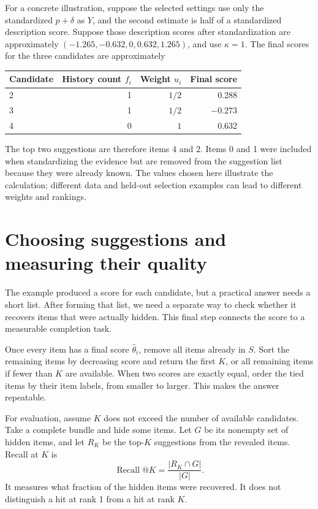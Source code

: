 \documentclass[11pt,a4paper]{article}
\numberwithin{equation}{section}
\begin{document}
For a concrete illustration, suppose the selected settings use only the standardized
$p+\delta$ as $Y$, and the second estimate is half of a standardized description score.
Suppose those description scores after standardization are approximately
$(-1.265,-0.632,0,0.632,1.265)$, and use $\kappa=1$. The final scores for the three
candidates are approximately
\begin{center}\begin{tabular}{@{}lrrr@{}}\toprule
Candidate & History count $f_i$ & Weight $u_i$ & Final score \\\midrule
2 & 1 & $1/2$ & 0.288 \\
3 & 1 & $1/2$ & $-0.273$ \\
4 & 0 & $1$ & 0.632 \\\bottomrule\end{tabular}\end{center}
The top two suggestions are therefore items 4 and 2. Items 0 and 1 were included when
standardizing the evidence but are removed from the suggestion list because they were
already known. The values chosen here illustrate the calculation; different data and
held-out selection examples can lead to different weights and rankings.

\section{Choosing suggestions and measuring their quality}
The example produced a score for each candidate, but a practical answer needs a short list.
After forming that list, we need a separate way to check whether it recovers items that
were actually hidden. This final step connects the score to a measurable completion task.

Once every item has a final score $\widehat\theta_i$, remove all items already in $S$.
Sort the remaining items by decreasing score and return the first $K$, or all remaining items if fewer than $K$ are available. When two scores are
exactly equal, order the tied items by their item labels, from smaller to larger. This makes
the answer repeatable.

For evaluation, assume $K$ does not exceed the number of available candidates. Take a complete bundle and hide some items. Let $G$ be its nonempty set of
hidden items, and let $R_K$ be the top-$K$ suggestions from the revealed items. Recall at
$K$ is
\begin{equation}
 \operatorname{Recall}@K=\frac{|R_K\cap G|}{|G|}.
\end{equation}
It measures what fraction of the hidden items were recovered. It does not distinguish a
hit at rank 1 from a hit at rank $K$.
\end{document}
